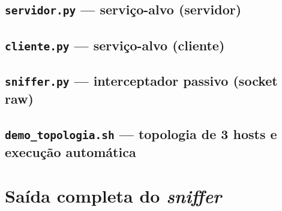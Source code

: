 \documentclass[11pt,a4paper]{article}
\begin{document}
\subsection{\texttt{servidor.py} — serviço-alvo (servidor)}


\subsection{\texttt{cliente.py} — serviço-alvo (cliente)}


\subsection{\texttt{sniffer.py} — interceptador passivo (socket raw)}


\subsection{\texttt{demo\_topologia.sh} — topologia de 3 hosts e execução automática}


\newpage
\section{Saída completa do \textit{sniffer}}
\label{ap:sniffer}

\end{document}
